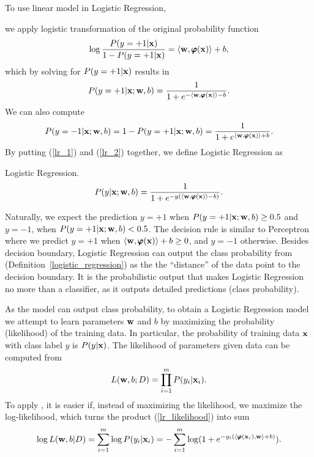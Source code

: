 {%
To use linear model in Logistic Regression, 
\iffalse
the first choice is to let $P(y=+1|\vx)$ be a linear function of $\vx$, while the problem is the linear function is unbounded but the probability $P(\vx)\in[0,1]$.
Another choice is to let $\log P(y=+1|\vx)$ be a linear function of $\vx$. 
However, the problem is the log-likelihood ranges from zero to infinite but the linear function is unbounded.
The choice in Logistic Regression is to use 
\fi
we apply logistic transformation of the original probability function
\begin{align*}
	\log\frac{P(y=+1|\mathbf {x})}{1-P(y=+1|\mathbf {x})} = \langle \mathbf {w}, \pmb \varphi(\mathbf {x}) \rangle + b,
\end{align*}
which by solving for $P(y=+1|\vx)$ results in 
\begin{align}
	P(y=+1|\mathbf {x};\mathbf {w},b) = \frac{1}{1+e^{ -\langle \mathbf {w}, \pmb \varphi(\mathbf {x}) \rangle-b }}. \label{lr_1}
\end{align}
We can also compute
\begin{align}
	P(y=-1|\mathbf {x};\mathbf {w},b)=1-P(y=+1|\mathbf {x};\mathbf {w},b)=\frac{1}{1+e^{ \langle \mathbf {w}, \pmb \varphi(\mathbf {x}) \rangle+b }}. \label{lr_2}
\end{align}
By putting (\ref{lr_1}) and (\ref{lr_2}) together, we define Logistic Regression as
\begin{definition}{Logistic Regression.} \label{logistic_regression}
	\begin{align*}
		P(y|\mathbf {x};\mathbf {w},b) = \frac{1}{1+e^{ -y(\langle \mathbf {w}, \pmb \varphi(\mathbf {x}) \rangle-b) }}.
	\end{align*}
\end{definition}
Naturally, we expect the prediction $y=+1$ when $P(y=+1|\mathbf {x};\mathbf {w},b)\ge0.5$ and $y=-1$, when $P(y=+1|\mathbf {x};\mathbf {w},b)<0.5$.
The decision rule is similar to Perceptron where we predict $y=+1$ when $\langle \mathbf {w}, \pmb \varphi(\mathbf {x}) \rangle+b\ge0$, and $y=-1$ otherwise.
Besides decision boundary, Logistic Regression can output the class probability from (Definition~\ref{logistic_regression}) as the the ``distance'' of the data point to the decision boundary.
It is the probabilistic output that makes Logistic Regression no more than a classifier, as it outputs detailed predictions (class probability).

As the model can output class probability, to obtain a Logistic Regression model we attempt to learn parameters $\mathbf {w}$ and $b$ by maximizing the probability (likelihood) of the training data.
In particular, the probability of training data $\vx$ with class label $y$ is $P(y|\mathbf {x})$.
The likelihood of parameters given data can be computed from
\begin{align}
	L(\mathbf {w},b;D) = \prod_{i=1}^mP(y_i|\mathbf {x}_i). \label{lr_likelihood}
\end{align}
To apply \mle, it is easier if, instead of maximizing the likelihood, we maximize the log-likelihood, which turns the product (\ref{lr_likelihood}) into sum
\begin{align}
	\log L(\mathbf {w},b|D) = \sum_{i=1}^{m}\log P(y_i|\mathbf {x}_i) = -\sum_{i=1}^{m}\log (1+e^{ -y_i(\langle \pmb \varphi(\mathbf {x}_i), \mathbf {w} \rangle+b) }) \label{lr_likelihood_sum}.
\end{align}

}
